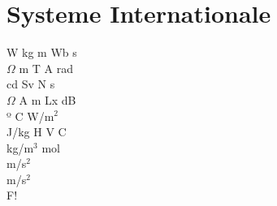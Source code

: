 \section{Systeme Internationale}
W kg m Wb s\\
$\Omega$  m T A rad\\
cd Sv N s\\
$\Omega$  A m Lx dB\\
º C W/m$^{2}$\\
J/kg H V C\\
kg/m$^{3}$ mol\\
m/s$^{2}$\\
m/s$^{2}$\\
F!\\